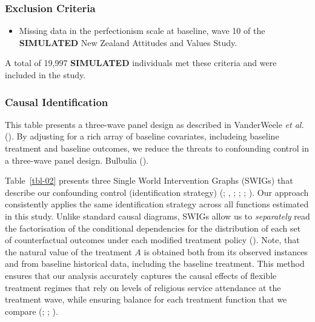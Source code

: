 \documentclass[
  single column]{article}
\providecommand{\tightlist}{%
  \setlength{\itemsep}{0pt}\setlength{\parskip}{0pt}}\usepackage{longtable,booktabs,array}
\begin{document}
\subsubsection{Exclusion Criteria}\label{exclusion-criteria}

\begin{itemize}
\tightlist
\item
  Missing data in the perfectionism scale at baseline, wave 10 of the
  \textbf{SIMULATED} New Zealand Attitudes and Values Study.
\end{itemize}

A total of 19,997 \textbf{SIMULATED} individuals met these criteria and
were included in the study.

\subsubsection{Causal Identification}\label{causal-identification}

\begin{table}

\caption{\label{tbl-02}This table presents a three-wave panel design as
described in VanderWeele \emph{et al.}
(). By adjusting for a rich array of
baseline covariates, includeing baseline treatment and baseline
outcomes, we reduce the threats to confounding control in a three-wave
panel design. Bulbulia ().}

\centering{

\examplelongitudinal

}

\end{table}%

Table~\ref{tbl-02} presents three Single World Intervention Graphs
(SWIGs) that describe our confounding control (identification strategy)
(;
,
;
;
;
). Our
approach consistently applies the same identification strategy across
all functions estimated in this study. Unlike standard causal diagrams,
SWIGs allow us to \emph{separately} read the factorisation of the
conditional dependencies for the distribution of each set of
counterfactual outcomes under each modified treatment policy
().
Note, that the natural value of the treatment \(A\) is obtained both
from its observed instances and from baseline historical data, including
the baseline treatment. This method ensures that our analysis accurately
captures the causal effects of flexible treatment regimes that rely on
levels of religious service attendance at the treatment wave, while
ensuring balance for each treatment function that we compare
(;
;
).
\end{document}
